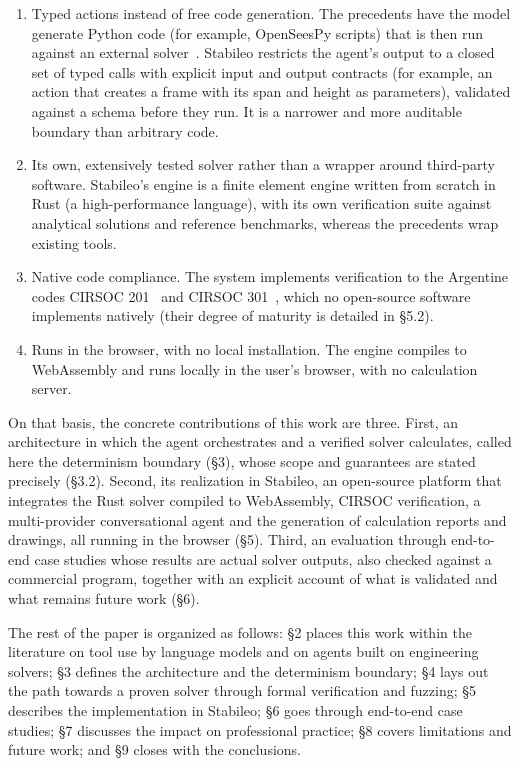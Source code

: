 \documentclass[11pt,a4paper]{article}
\begin{document}
\begin{enumerate}
  \item Typed actions instead of free code generation. The precedents have the model generate Python code (for example, OpenSeesPy scripts) that is then run against an external solver~\cite{ref7,ref8}. Stabileo restricts the agent's output to a closed set of typed calls with explicit input and output contracts (for example, an action that creates a frame with its span and height as parameters), validated against a schema before they run. It is a narrower and more auditable boundary than arbitrary code.
  \item Its own, extensively tested solver rather than a wrapper around third-party software. Stabileo's engine is a finite element engine written from scratch in Rust (a high-performance language), with its own verification suite against analytical solutions and reference benchmarks, whereas the precedents wrap existing tools.
  \item Native code compliance. The system implements verification to the Argentine codes CIRSOC 201~\cite{ref9} and CIRSOC 301~\cite{ref10}, which no open-source software implements natively (their degree of maturity is detailed in §5.2).
  \item Runs in the browser, with no local installation. The engine compiles to WebAssembly and runs locally in the user's browser, with no calculation server.
\end{enumerate}

On that basis, the concrete contributions of this work are three. First, an architecture in which the agent orchestrates and a verified solver calculates, called here the determinism boundary (§3), whose scope and guarantees are stated precisely (§3.2). Second, its realization in Stabileo, an open-source platform that integrates the Rust solver compiled to WebAssembly, CIRSOC verification, a multi-provider conversational agent and the generation of calculation reports and drawings, all running in the browser (§5). Third, an evaluation through end-to-end case studies whose results are actual solver outputs, also checked against a commercial program, together with an explicit account of what is validated and what remains future work (§6).

The rest of the paper is organized as follows: §2 places this work within the literature on tool use by language models and on agents built on engineering solvers; §3 defines the architecture and the determinism boundary; §4 lays out the path towards a proven solver through formal verification and fuzzing; §5 describes the implementation in Stabileo; §6 goes through end-to-end case studies; §7 discusses the impact on professional practice; §8 covers limitations and future work; and §9 closes with the conclusions.
\end{document}
